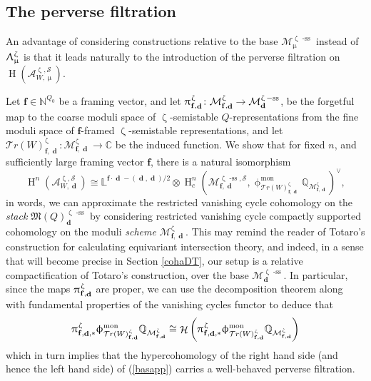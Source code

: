 \documentclass[a4paper,10pt]{amsart}
\renewcommand{\zeta}{\upzeta}
\renewcommand{\pi}{\uppi\hspace{0.05em}}
\renewcommand{\Lambda}{\Uplambda}
\renewcommand{\phi}{\upphi}
\renewcommand{\mu}{\upmu}
\newcommand{\ff}{\mathbf{f}}
\newcommand{\LL}{\mathbb{L}}
\newcommand{\SP}{\mathcal{S}}
\newcommand{\WW}{\mathcal{T}r(W)}
\newcommand{\Mst}{\mathfrak{M}}
\newcommand{\Msp}{\mathcal{M}}
\newcommand{\phim}[1]{\phi^{\mon}_{#1}}
\DeclareMathOperator{\sst}{-ss}
\DeclareMathOperator{\mon}{mon}
\DeclareMathOperator{\dd}{\mathbf{d}}
\DeclareMathOperator{\Ho}{\mathcal{H}}
\DeclareMathOperator{\HO}{H}
\begin{document}
\subsection{The perverse filtration}
An advantage of considering constructions relative to the base $\Msp_{\mu}^{\zeta\sst}$ instead of $\Lambda_{\mu}^{\zeta}$ is that it leads naturally to the introduction of the perverse filtration on $\HO(\mathcal{A}_{W,\mu}^{\zeta,\SP})$.  

Let $\ff\in\mathbb{N}^{Q_0}$ be a framing vector, and let $\pi^{\zeta}_{\ff,\dd}\colon \Msp^{\zeta}_{\ff,\dd}\rightarrow\Msp^{\zeta\sst}_{\dd}$, be the forgetful map to the coarse moduli space of $\zeta$-semistable $Q$-representations from the fine moduli space of $\ff$-framed $\zeta$-semistable representations, and let $\WW_{\ff,\dd}^{\zeta}\colon \Msp^{\zeta}_{\ff,\dd}\rightarrow \mathbb{C}$ be the induced function.  We show that for fixed $n$, and sufficiently large framing vector $\ff$, there is a natural isomorphism
\begin{equation}
\label{basapp}
\HO^n(\mathcal{A}_{W,\dd}^{\zeta,\SP})\cong\LL^{\ff\cdot\dd-(\dd,\dd)/2}\otimes \HO_c^n(\Msp^{\zeta\sst,\SP}_{\ff,\dd},\phim{\WW_{\ff,\dd}^{\zeta}}\mathbb{Q}_{\Msp^{\zeta}_{\ff,\dd}})^{\vee},
\end{equation}
in words, we can approximate the restricted vanishing cycle cohomology on the \textit{stack} $\Mst(Q)_{\dd}^{\zeta\sst}$ by considering restricted vanishing cycle compactly supported cohomology on the moduli \textit{scheme} $\Msp^{\zeta}_{\ff,\dd}$.  This may remind the reader of Totaro's construction \cite{To99} for calculating equivariant intersection theory, and indeed, in a sense that will become precise in Section \ref{cohaDT}, our setup is a relative compactification of Totaro's construction, over the base $\Msp^{\zeta\sst}_{\dd}$.  In particular, since the maps $\pi^{\zeta}_{\ff,\dd}$ are proper, we can use the decomposition theorem along with fundamental properties of the vanishing cycles functor to deduce that 
\[
\pi^{\zeta}_{\ff,\dd,*}\phim{\WW_{\ff,\dd}^{\zeta}}\mathbb{Q}_{\Msp^{\zeta}_{\ff,\dd}}\cong\Ho\left(\pi^{\zeta}_{\ff,\dd,*}\phim{\WW_{\ff,\dd}^{\zeta}}\mathbb{Q}_{\Msp^{\zeta}_{\ff,\dd}}\right)
\]
which in turn implies that the hypercohomology of the right hand side (and hence the left hand side) of (\ref{basapp}) carries a well-behaved perverse filtration.
\end{document}
